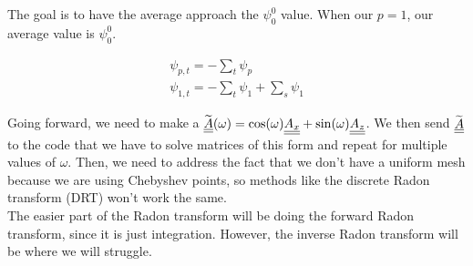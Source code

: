 The goal is to have the average approach the $\psi_0^0$ value. When our $p = 1$, our average value is $\psi_0^0$. 

\begin{align*}
\psi_{p,t} = -\sum_t \psi_p \\
\psi_{1,t} = -\sum_t \psi_1 + \sum_s \psi_1
\end{align*}

Going forward, we need to make a $\widetilde{{\underline{\underline{A}}}} (\omega) = \cos(\omega) {\underline{\underline{A_x}}} + \sin(\omega) {\underline{\underline{A_z}}}$. We then send $\widetilde{{\underline{\underline{A}}}}$ to the code that we have to solve matrices of this form and repeat for multiple values of $\omega$. Then, we need to address the fact that we don't have a uniform mesh because we are using Chebyshev points, so methods like the discrete Radon transform (DRT) won't work the same. \\
The easier part of the Radon transform will be doing the forward Radon transform, since it is just integration. However, the inverse Radon transform will be where we will struggle. 
